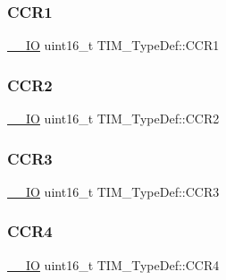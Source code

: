 \subsubsection{\texorpdfstring{CCR1}{CCR1}}
{\footnotesize\ttfamily \mbox{\hyperlink{group___c_m_s_i_s___c_m3__core__definitions_gaec43007d9998a0a0e01faede4133d6be}{\+\_\+\+\_\+\+IO}} uint16\+\_\+t T\+I\+M\+\_\+\+Type\+Def\+::\+C\+C\+R1}

\mbox{\label{struct_t_i_m___type_def_ae72bdd579eec96a3b863fb1720195f50}} 
\subsubsection{\texorpdfstring{CCR2}{CCR2}}
{\footnotesize\ttfamily \mbox{\hyperlink{group___c_m_s_i_s___c_m3__core__definitions_gaec43007d9998a0a0e01faede4133d6be}{\+\_\+\+\_\+\+IO}} uint16\+\_\+t T\+I\+M\+\_\+\+Type\+Def\+::\+C\+C\+R2}

\mbox{\label{struct_t_i_m___type_def_ad8c1bcb20bf3080af8440994a247cc9c}} 
\subsubsection{\texorpdfstring{CCR3}{CCR3}}
{\footnotesize\ttfamily \mbox{\hyperlink{group___c_m_s_i_s___c_m3__core__definitions_gaec43007d9998a0a0e01faede4133d6be}{\+\_\+\+\_\+\+IO}} uint16\+\_\+t T\+I\+M\+\_\+\+Type\+Def\+::\+C\+C\+R3}

\mbox{\label{struct_t_i_m___type_def_a858fde116b024a952326715731650bc2}} 
\subsubsection{\texorpdfstring{CCR4}{CCR4}}
{\footnotesize\ttfamily \mbox{\hyperlink{group___c_m_s_i_s___c_m3__core__definitions_gaec43007d9998a0a0e01faede4133d6be}{\+\_\+\+\_\+\+IO}} uint16\+\_\+t T\+I\+M\+\_\+\+Type\+Def\+::\+C\+C\+R4}

\mbox{\label{struct_t_i_m___type_def_ad6920b90862a061dd50b13760cb07e68}} 
